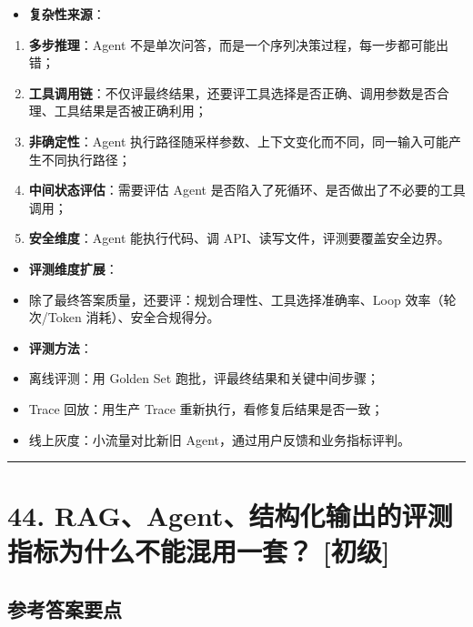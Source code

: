 \documentclass[9pt,a4paper,twocolumn]{ctexart}
\newcommand{\lvchu}{\usebox{\badgechubox}}
\def\lvchu{[初级]}%
\begin{document}
\begin{itemize}[itemsep=1pt, topsep=2pt]
  \item \textbf{复杂性来源}：
\end{itemize}
\begin{enumerate}[itemsep=1pt, topsep=2pt]
  \item \textbf{多步推理}：Agent 不是单次问答，而是一个序列决策过程，每一步都可能出错；
  \item \textbf{工具调用链}：不仅评最终结果，还要评工具选择是否正确、调用参数是否合理、工具结果是否被正确利用；
  \item \textbf{非确定性}：Agent 执行路径随采样参数、上下文变化而不同，同一输入可能产生不同执行路径；
  \item \textbf{中间状态评估}：需要评估 Agent 是否陷入了死循环、是否做出了不必要的工具调用；
  \item \textbf{安全维度}：Agent 能执行代码、调 API、读写文件，评测要覆盖安全边界。
\end{enumerate}
\begin{itemize}[itemsep=1pt, topsep=2pt]
  \item \textbf{评测维度扩展}：
  \item 除了最终答案质量，还要评：规划合理性、工具选择准确率、Loop 效率（轮次/Token 消耗）、安全合规得分。
  \item \textbf{评测方法}：
  \item 离线评测：用 Golden Set 跑批，评最终结果和关键中间步骤；
  \item Trace 回放：用生产 Trace 重新执行，看修复后结果是否一致；
  \item 线上灰度：小流量对比新旧 Agent，通过用户反馈和业务指标评判。
\end{itemize}


\vspace{2pt}
\noindent\rule{\columnwidth}{0.3pt}\vspace{2pt}



\section*{44. RAG、Agent、结构化输出的评测指标为什么不能混用一套？ \lvchu{}}


\subsection*{参考答案要点}
\end{document}
